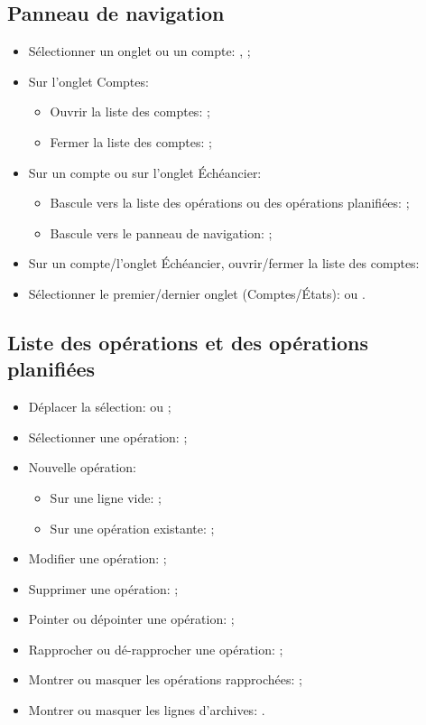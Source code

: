 \subsection{Panneau de navigation}

\begin{itemize}
	\item Sélectionner un onglet ou un compte: \keys{\arrowkeyup}, \keys{\arrowkeydown};
	\item Sur l'onglet Comptes:
		\begin{itemize}
			\item Ouvrir la liste des comptes: \keys{\arrowkeyright};
			\item Fermer la liste des comptes: \keys{\arrowkeyleft};
		\end{itemize}
	\item Sur un compte ou sur l'onglet Échéancier:
		\begin{itemize}
			\item Bascule vers la liste des opérations ou des opérations planifiées: \keys{\arrowkeyright};
			\item Bascule vers le panneau de navigation: \keys{\arrowkeyleft};
		\end{itemize}
	\item Sur un compte/l'onglet Échéancier, ouvrir/fermer la liste des comptes:
	\item Sélectionner le premier/dernier onglet (Comptes/États):  ou .
\end{itemize}


\subsection{Liste des opérations et des opérations planifiées}

\begin{itemize}
	\item Déplacer la sélection: \keys{\arrowkeyup} ou \keys{\arrowkeydown};
	\item Sélectionner une opération: ;
	\item Nouvelle opération:
		\begin{itemize}
			\item Sur une ligne vide: ;
			\item Sur une opération existante: ;
		\end{itemize}
	\item Modifier une opération: ;
	\item Supprimer une opération: ;
	\item Pointer ou dépointer une opération: ;
	\item Rapprocher ou dé-rapprocher une opération: ;
	\item Montrer ou masquer les opérations rapprochées: ;
	\item Montrer ou masquer les lignes d'archives: .
\end{itemize}


